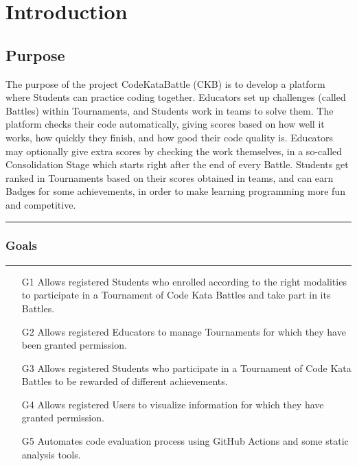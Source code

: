 \documentclass{Configuration_Files/PoliMi3i_thesis}
\begin{document}
\chapter{Introduction}

\section{Purpose}

The purpose of the project CodeKataBattle (CKB) is to develop a platform where Students can practice coding together. Educators set up challenges (called Battles) within Tournaments, and Students work in teams to solve them. The platform checks their code automatically, giving scores based on how well it works, how quickly they finish, and how good their code quality is. Educators may optionally give extra scores by checking the work themselves, in a so-called Consolidation Stage which starts right after the end of every Battle. Students get ranked in Tournaments based on their scores obtained in teams, and can earn Badges for some achievements, in order to make learning programming more fun and competitive.

{\color{bluepoli}\rule{\linewidth}{0.1pt}}

\subsection{Goals}

{\color{bluepoli}\rule{\linewidth}{0.1pt}}

\begin{enumerate}
    \item[\textcolor{bluepoli}{G1}] Allows registered Students who enrolled according to the right modalities to participate in a Tournament of Code Kata Battles and take part in its Battles.
    \item[\textcolor{bluepoli}{G2}] Allows registered Educators to manage Tournaments for which they have been granted permission.
    \item[\textcolor{bluepoli}{G3}] Allows registered Students who participate in a Tournament of Code Kata Battles to be rewarded of different achievements.
    \item[\textcolor{bluepoli}{G4}] Allows registered Users to visualize information for which they have granted permission.
    \item[\textcolor{bluepoli}{G5}] Automates code evaluation process using GitHub Actions and some static analysis tools.
\end{enumerate}
\end{document}
